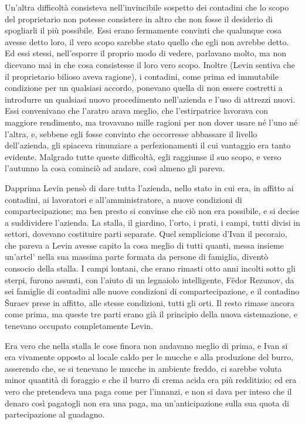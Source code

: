 Un'altra difficoltà consisteva nell'invincibile sospetto dei contadini che lo scopo del proprietario non potesse consistere in altro che non fosse il desiderio di spogliarli il più possibile. Essi erano fermamente convinti che qualunque cosa avesse detto loro, il vero scopo sarebbe stato quello che egli non avrebbe detto. Ed essi stessi, nell'esporre il proprio modo di vedere, parlavano molto, ma non dicevano mai in che cosa consistesse il loro vero scopo. Inoltre (Levin sentiva che il proprietario bilioso aveva ragione), i contadini, come prima ed immutabile condizione per un qualsiasi accordo, ponevano quella di non essere costretti a introdurre un qualsiasi nuovo procedimento nell'azienda e l'uso di attrezzi nuovi. Essi convenivano che l'aratro arava meglio, che l'estirpatrice lavorava con maggiore rendimento, ma trovavano mille ragioni per non dover usare né l'uno né l'altra, e, sebbene egli fosse convinto che occorresse abbassare il livello dell'azienda, gli spiaceva rinunziare a perfezionamenti il cui vantaggio era tanto evidente. Malgrado tutte queste difficoltà, egli raggiunse il suo scopo, e verso l'autunno la cosa cominciò ad andare, così almeno gli pareva. 

Dapprima Levin pensò di dare tutta l'azienda, nello stato in cui era, in affitto ai contadini, ai lavoratori e all'amministratore, a nuove condizioni di compartecipazione; ma ben presto si convinse che ciò non era possibile, e si decise a suddividere l'azienda. La stalla, il giardino, l'orto, i prati, i campi, tutti divisi in settori, dovevano costituire parti separate. Quel semplicione d'Ivan il pecoraio, che pareva a Levin avesse capito la cosa meglio di tutti quanti, messa insieme un'artel' nella sua massima parte formata da persone di famiglia, diventò consocio della stalla. I campi lontani, che erano rimasti otto anni incolti sotto gli sterpi, furono assunti, con l'aiuto di un legnaiolo intelligente, Fëdor Rezunov, da sei famiglie di contadini alle nuove condizioni di compartecipazione, e il contadino Šuraev prese in affitto, alle stesse condizioni, tutti gli orti. Il resto rimase ancora come prima, ma queste tre parti erano già il principio della nuova sistemazione, e tenevano occupato completamente Levin. 

Era vero che nella stalla le cose finora non andavano meglio di prima, e Ivan si era vivamente opposto al locale caldo per le mucche e alla produzione del burro, asserendo che, se si tenevano le mucche in ambiente freddo, ci sarebbe voluta minor quantità di foraggio e che il burro di crema acida era più redditizio; ed era vero che pretendeva una paga come per l'innanzi, e non si dava per inteso che il denaro così pagatogli non era una paga, ma un'anticipazione sulla sua quota di partecipazione al guadagno. 

